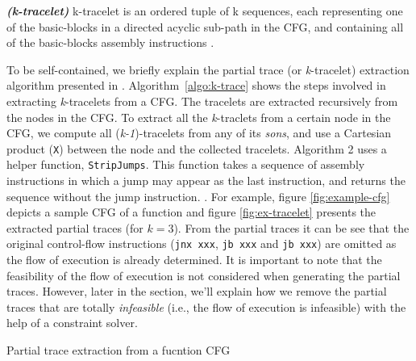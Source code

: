 \begin{mydef}
\emph{\textbf{(\textit{k}-tracelet)}} k-tracelet is an ordered tuple of k sequences, each representing one of the basic-blocks in a directed acyclic sub-path in the CFG, and containing all of the basic-blocks assembly instructions \cite{david2014tracelet}.
\end{mydef}

To be self-contained, we briefly explain the partial trace (or \textit{k}-tracelet) extraction algorithm presented in \cite{david2014tracelet}. Algorithm~\ref{algo:k-trace} shows the steps involved in extracting \textit{k}-tracelets from a CFG. The tracelets are extracted recursively from the nodes in the CFG. To extract all the \textit{k}-traclets from a certain node in the CFG, we compute all (\textit{k-1})-tracelets from any of its \textit{sons}, and use a Cartesian product (\texttt{X}) between the node and the collected tracelets. Algorithm 2 uses a helper function, \texttt{StripJumps}. This function takes a sequence of assembly instructions in which a jump may appear as the last instruction, and returns the sequence without the jump instruction. 
. 
For example, figure \ref{fig:example-cfg} depicts a sample CFG of a function and figure \ref{fig:ex-tracelet} presents the extracted partial traces (for $\textit{k} = 3$). From the partial traces it can be see that the original control-flow instructions (\texttt{jnx xxx}, \texttt{jb xxx} and \texttt{jb xxx}) are omitted as the flow of execution is already determined. It is important to note that the feasibility of the flow of execution is not considered when generating the partial traces. However, later in the section, we'll explain how we remove the partial traces that are totally \textit{infeasible} (i.e., the flow of execution is infeasible) with the help of a constraint solver.  




\begin{MyAlgo}[!ht]{-4.9cm} %
 \DontPrintSemicolon
  \setcounter{AlgoLine}{0}
 \caption{Partial trace extraction from a fucntion CFG}\label{algo:k-trace}
\end{MyAlgo}

